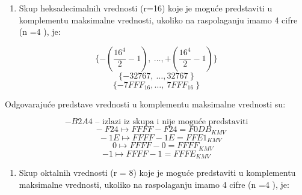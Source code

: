 \documentclass[a4paper,11pt]{article}
\numberwithin{equation}{section}
\begin{document}
\begin{enumerate}[label=\alph*),start=2,leftmargin=*]
\item Skup heksadecimalnih vrednosti (r=16) koje je moguće predstaviti u komplementu maksimalne vrednosti, ukoliko na raspolaganju imamo 4 cifre (n =4 ), je:

\end{enumerate}


\begin{equation}\label{eq:2.4.8}
\{ - \left( \frac{16^{4}}{2} - 1 \right),\ \ldots, + \left( \frac{16^{4}}{2} - 1 \right)\}
\end{equation}
\begin{equation}\label{eq:2.4.9}
\{ - 32767,\ \ldots,32767\ \}
\end{equation}
\begin{equation}\label{eq:2.4.10}
\{ - {7FFF}_{16},\ldots,\ {7FFF}_{16}\ \}
\end{equation}


Odgovarajuće predstave vrednosti u komplementu maksimalne vrednosti su:



\begin{equation}\label{eq:2.4.11}
\text{\(- B2A4\) – izlazi iz skupa i nije moguće predstaviti}
\end{equation}
\begin{equation}\label{eq:2.4.12}
\ \ \ \  - F24 \longmapsto FFFF - F24 = {F0DB}_{KMV}
\end{equation}
\begin{equation}\label{eq:2.4.13}
\ \ \ \  - 1E \longmapsto FFFF - 1E = {FFE1}_{KMV}
\end{equation}
\begin{equation}\label{eq:2.4.14}
\ \ \ \ \ \ \ 0 \longmapsto FFFF - 0 = {FFFF}_{KMV}
\end{equation}
\begin{equation}\label{eq:2.4.15}
-1 \longmapsto FFFF - 1 = {FFFE}_{KMV}
\end{equation}


\begin{enumerate}[label=\alph*),start=3,leftmargin=*]
\item Skup oktalnih vrednosti (r = 8) koje je moguće predstaviti u komplementu maksimalne vrednosti, ukoliko na raspolaganju imamo 4 cifre (n =4 ), je:

\end{enumerate}
\end{document}
